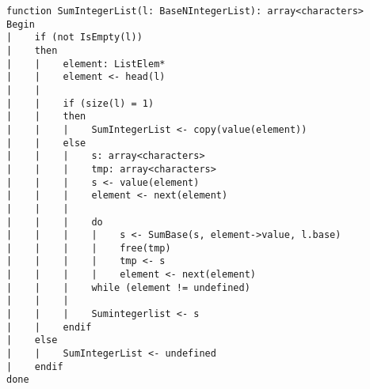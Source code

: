\begin{lstlisting}[breaklines]
function SumIntegerList(l: BaseNIntegerList): array<characters>
Begin
|    if (not IsEmpty(l))
|    then
|    |    element: ListElem*
|    |    element <- head(l)
|    |
|    |    if (size(l) = 1)
|    |    then
|    |    |    SumIntegerList <- copy(value(element))
|    |    else
|    |    |    s: array<characters>
|    |    |    tmp: array<characters>
|    |    |    s <- value(element)
|    |    |    element <- next(element)
|    |    |
|    |    |    do
|    |    |    |    s <- SumBase(s, element->value, l.base)
|    |    |    |    free(tmp)
|    |    |    |    tmp <- s
|    |    |    |    element <- next(element)
|    |    |    while (element != undefined)
|    |    |
|    |    |    Sumintegerlist <- s
|    |    endif
|    else
|    |    SumIntegerList <- undefined
|    endif
done
\end{lstlisting}
